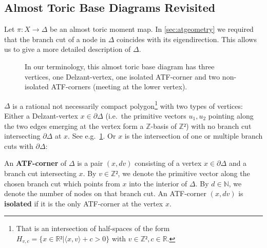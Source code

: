 \documentclass[12pt,a4paper,abstract=true,draft]{scrartcl}
\begin{document}
\subsection{Almost Toric Base Diagrams Revisited}
\label{sec:atf_base_diagrams}

Let $π:X → Δ$ be an almost toric moment map.
In \cref{sec:atgeometry} we required that the branch cut of a node in $Δ$ coincides with its eigendirection.
This allows us to give a more detailed description of $Δ$.

\begin{figure}
  \centering
  \caption{In our terminology, this almost toric base diagram has three vertices, one Delzant-vertex, one isolated ATF-corner and two non-isolated ATF-corners (meeting at the lower vertex).}
  \label{fig:atf_example2}
\end{figure}

$Δ$ is a rational not necessarily compact polygon\footnote{That is an intersection of half-spaces of the form $H_{v,c} = \{x ∈ ℝ² | ⟨x,v⟩+c > 0\}$ with $v ∈ ℤ², c ∈ ℝ$.} with two types of vertices: Either a Delzant-vertex $x ∈ ∂Δ$ (i.e.\ the primitive vectors $u_1,u_2$ pointing along the two edges emerging at the vertex form a $ℤ$-basis of $ℤ²$) with no branch cut intersecting $∂Δ$ at $x$. See e.g.\ \cref{fig:atf_example2}.
Or $x$ is the intersection of one or multiple branch cuts with $∂Δ$:

\begin{definition}
  \label{def:atf_corner}
  An \textbf{ATF-corner} of $Δ$ is a pair $(x,dv)$ consisting of a vertex $x ∈ ∂Δ$ and a branch cut intersecting $x$.
  By $v ∈ ℤ²$, we denote the primitive vector along the chosen branch cut which points from $x$ into the interior of $\Delta$.
  By $d \in \mathbb{N}$, we denote the number of nodes on that branch cut.
An ATF-corner $(x,dv)$ is \textbf{isolated} if it is the only ATF-corner at the vertex $x$. 
\end{definition}
\end{document}
